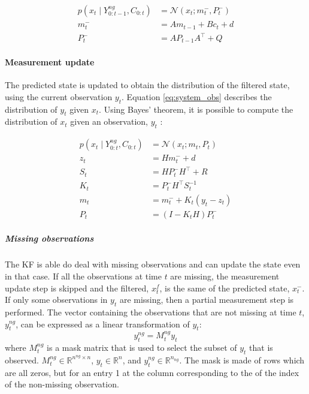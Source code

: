 \documentclass{article}
\newcommand{\norm}[3]{\mathcal{N}\left(#1; #2, #3\right)} %
\begin{document}
\begin{equation}
\begin{aligned}\label{eq:time_update}
    p(x_t \mid Y^{ng}_{0:t-1}, C_{0:t}) &= \norm{x_t}{m_t^-}{ P_t^-}\\
    m_t^- &= Am_{t-1} + B c_t + d \\
    P_t^- &= AP_{t-1}A^\top + Q
\end{aligned}
\end{equation}

\paragraph{Measurement update}

The predicted state is updated to obtain the distribution of the filtered state, using the current observation $y_t$. Equation \ref{eq:system_obs} describes the distribution of $y_t$ given $x_t$. Using Bayes' theorem, it is possible to compute the distribution of $x_t$ given an observation, $y_t$ \cite{bishop_pattern_2006, 2020_hennig_pml}:

\begin{equation}
\begin{aligned}
     p(x_t \mid Y^{ng}_{0:t}, C_{0:t}) &= \mathcal{N}(x_t; m_t, P_t) \label{eq:meas_update}\\
     z_t &= Hm_t^- + d \\
     S_t &= HP_t^-H^\top + R \\
     K_t &= P_t^-H^\top S_t^{-1} \\
     m_t &= m_t^- + K_t(y_t - z_t) \\
     P_t &= (I-K_tH)P_t^-
\end{aligned}
\end{equation}

\subparagraph{Missing observations}

The KF is able do deal with missing observations and can update the state even in that case.
If all the observations at time $t$ are missing, the measurement update step is skipped and the filtered, $x^f_t$, is the same of the predicted state, $x_t^-$. If only some observations in $y_t$ are missing, then a partial measurement step is performed.
The vector containing the observations that are not missing at time $t$, $y^{ng}_t$, can be expressed as a linear transformation of $y_t$:
\begin{equation}\label{eq:miss_obs}
    y^{ng}_t = M^{ng}_ty_t
\end{equation}
where $M^{ng}_t$ is a mask matrix that is used to select the subset of $y_t$ that is observed. $M_t^{ng} \in \mathbb{R}^{n^{ng} \times n}$, $y_t \in \mathbb{R}^n$, and $y_t^{ng} \in \mathbb{R}^{n_{ng}}$. The mask is made of rows which are all zeros, but for an entry 1 at the column corresponding to the of the index of the non-missing observation.
\end{document}
